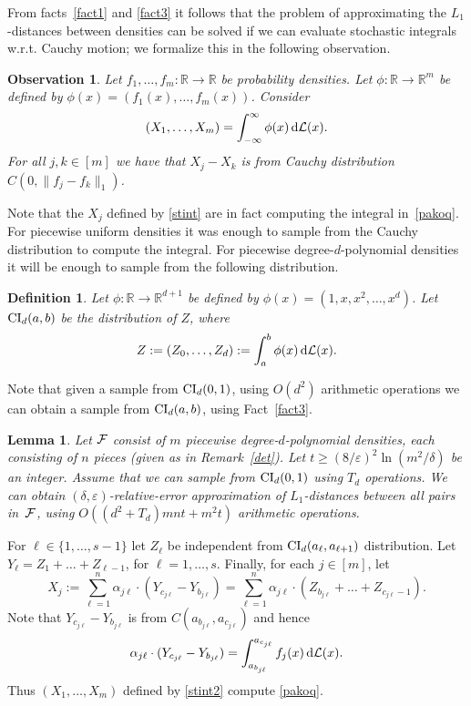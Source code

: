 \documentclass[11pt]{article}
\def\eps{\varepsilon}
\def\R{{\mathbb R}}
\newtheorem{obs}[thm]{Observation}
\newtheorem{lem}[thm]{Lemma}
\newtheorem{dfn}[thm]{Definition}
\newenvironment{prf}[1]{\noindent{\bf{Proof #1\\}}}{$\hfill\blacksquare$\nopagebreak[4]\vskip 0.3cm}
\def\BOBS{\begin{obs}}
\def\EOBS{\end{obs}}
\def\BDEF{\begin{dfn}\rm}
\def\EDEF{\end{dfn}}
\newcommand\BPRF[1][:]{\begin{prf}{#1}}
\def\BLEM{\begin{lem}}
\def\ELEM{\end{lem}}
\begin{document}
From facts~\ref{fact1} and \ref{fact3} it follows that the problem of approximating the $L_1$-distances
between densities can be solved if we can evaluate stochastic integrals w.r.t. Cauchy motion;
we formalize this in the following observation.

\BOBS
Let $f_1,\dots,f_m:\R\rightarrow\R$ be probability densities. Let $\phi:\R\rightarrow\R^m$ be defined by
$\phi(x)=(f_1(x),\dots,f_m(x))$. Consider
\begin{equation}\label{pakoq}
(X_1,\dots,X_m)=\int_{-\infty}^{\infty} \phi(x)\,{\rm d}{\cal L}(x).
\end{equation}
For all $j,k\in [m]$ we have that $X_j-X_k$ is from Cauchy distribution $C(0,\|f_j-f_k\|_1)$.
\EOBS

Note that the $X_j$ defined by \eqref{stint} are in fact computing the integral in~\eqref{pakoq}. For
piecewise uniform densities it was enough to sample from the Cauchy distribution to compute the integral.
For piecewise degree-$d$-polynomial densities it will be enough to sample from the following distribution.

\BDEF
Let $\phi:\R\rightarrow\R^{d+1}$ be defined by $\phi(x)=(1,x,x^2,\dots,x^d)$. Let ${\rm CI}_d(a,b)$
be the distribution of $Z$, where
$$
Z:=(Z_0,\dots,Z_d):=\int_{a}^b \phi(x)\,{\rm d}{\cal L}(x).
$$
\EDEF

Note that given a sample from ${\rm CI}_d(0,1)$, using $O(d^2)$ arithmetic operations
we can obtain a sample from ${\rm CI}_d(a,b)$, using Fact~\ref{fact3}.

\BLEM\label{lpiece}
Let ${\cal F}$ consist of $m$ piecewise degree-$d$-polynomial densities, each consisting of $n$
pieces (given as in Remark~\ref{det}). Let $t\geq (8/\eps)^2\ln (m^2/\delta)$ be an integer.
Assume that we can sample from ${\rm CI}_d(0,1)$ using $T_d$ operations. We can obtain
$(\delta,\eps)$-relative-error approximation of $L_1$-distances between all
pairs in~${\cal F}$, using $O((d^2+T_d) mnt+m^2t)$ arithmetic operations.
\ELEM

\BPRF
For $\ell\in\{1,\dots,s-1\}$ let $Z_\ell$ be independent from ${\rm CI}_d(a_\ell,a_{\ell+1})$ distribution. Let
$Y_{\ell}=Z_1+\dots+Z_{\ell-1}$, for $\ell=1,\dots,s$. Finally, for each $j\in [m]$, let
\begin{equation}\label{stint2}
X_j:=\sum_{\ell=1}^n \alpha_{j\ell}\cdot (Y_{c_{j\ell}} - Y_{b_{j\ell}})=\sum_{\ell=1}^n\alpha_{j\ell}
\cdot (Z_{b_{j\ell}}+\dots+Z_{c_{j\ell}-1}).
\end{equation}
Note that $Y_{c_{j\ell}} - Y_{b_{j\ell}}$ is from $C(a_{b_{j\ell}},a_{c_{j\ell}})$
and hence
$$
\alpha_{j\ell}\cdot (Y_{c_{j\ell}} - Y_{b_{j\ell}}) = \int_{a_{b_{j\ell}}}^{a_{c_{j\ell}}} f_j(x)\,{\rm d}{\cal L}(x).
$$
Thus $(X_1,\dots,X_m)$ defined by \eqref{stint2} compute \eqref{pakoq}.
\end{document}
